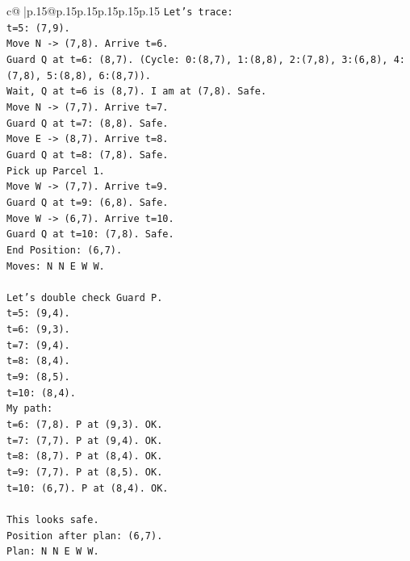 \documentclass{article}
\begin{document}
{\begin{supertabular}{c@{$\;$}|p{.15\linewidth}@{}p{.15\linewidth}p{.15\linewidth}p{.15\linewidth}p{.15\linewidth}p{.15\linewidth}}
{{{\texttt{Let's trace:} \\
\texttt{t=5: (7,9).} \\
\texttt{Move N {-}> (7,8). Arrive t=6.} \\
\texttt{Guard Q at t=6: (8,7). (Cycle: 0:(8,7), 1:(8,8), 2:(7,8), 3:(6,8), 4:(7,8), 5:(8,8), 6:(8,7)).} \\
\texttt{Wait, Q at t=6 is (8,7). I am at (7,8). Safe.} \\
\texttt{Move N {-}> (7,7). Arrive t=7.} \\
\texttt{Guard Q at t=7: (8,8). Safe.} \\
\texttt{Move E {-}> (8,7). Arrive t=8.} \\
\texttt{Guard Q at t=8: (7,8). Safe.} \\
\texttt{Pick up Parcel 1.} \\
\texttt{Move W {-}> (7,7). Arrive t=9.} \\
\texttt{Guard Q at t=9: (6,8). Safe.} \\
\texttt{Move W {-}> (6,7). Arrive t=10.} \\
\texttt{Guard Q at t=10: (7,8). Safe.} \\
\texttt{End Position: (6,7).} \\
\texttt{Moves: N N E W W.} \\
\\ 
\texttt{Let's double check Guard P.} \\
\texttt{t=5: (9,4).} \\
\texttt{t=6: (9,3).} \\
\texttt{t=7: (9,4).} \\
\texttt{t=8: (8,4).} \\
\texttt{t=9: (8,5).} \\
\texttt{t=10: (8,4).} \\
\texttt{My path:} \\
\texttt{t=6: (7,8). P at (9,3). OK.} \\
\texttt{t=7: (7,7). P at (9,4). OK.} \\
\texttt{t=8: (8,7). P at (8,4). OK.} \\
\texttt{t=9: (7,7). P at (8,5). OK.} \\
\texttt{t=10: (6,7). P at (8,4). OK.} \\
\\ 
\texttt{This looks safe.} \\
\texttt{Position after plan: (6,7).} \\
\texttt{Plan: N N E W W.} \\
\\ 
}}}
\end{supertabular}}
\end{document}
